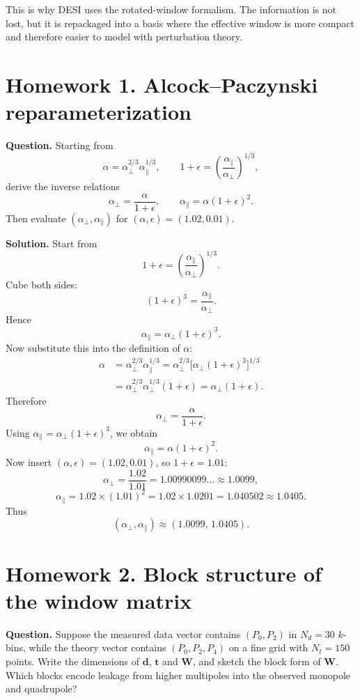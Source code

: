 \documentclass[11pt]{article}
\newcommand{\W}{\mathbf W}
\newcommand{\tvec}{\mathbf t}
\newcommand{\dvec}{\mathbf d}
\begin{document}
This is why DESI uses the rotated-window formalism. The information is not lost, but it is repackaged into a basis where the effective window is more compact and therefore easier to model with perturbation theory.

\section*{Homework 1. Alcock--Paczynski reparameterization}
\textbf{Question.} Starting from
\[
\alpha=\alpha_{\perp}^{2/3}\alpha_{\parallel}^{1/3},
\qquad
1+\epsilon=\left(\frac{\alpha_{\parallel}}{\alpha_{\perp}}\right)^{1/3},
\]
derive the inverse relations
\[
\alpha_{\perp}=\frac{\alpha}{1+\epsilon},
\qquad
\alpha_{\parallel}=\alpha(1+\epsilon)^2.
\]
Then evaluate $(\alpha_{\perp},\alpha_{\parallel})$ for $(\alpha,\epsilon)=(1.02,0.01)$.

\bigskip
\textbf{Solution.}
Start from
\[
1+\epsilon=\left(\frac{\alpha_{\parallel}}{\alpha_{\perp}}\right)^{1/3}.
\]
Cube both sides:
\[
(1+\epsilon)^3=\frac{\alpha_{\parallel}}{\alpha_{\perp}}.
\]
Hence
\[
\alpha_{\parallel}=\alpha_{\perp}(1+\epsilon)^3.
\]
Now substitute this into the definition of $\alpha$:
\begin{align*}
\alpha
&=\alpha_{\perp}^{2/3}\alpha_{\parallel}^{1/3}
=\alpha_{\perp}^{2/3}\big[\alpha_{\perp}(1+\epsilon)^3\big]^{1/3}\\
&=\alpha_{\perp}^{2/3}\alpha_{\perp}^{1/3}(1+\epsilon)
=\alpha_{\perp}(1+\epsilon).
\end{align*}
Therefore
\[
\boxed{\alpha_{\perp}=\frac{\alpha}{1+\epsilon}.}
\]
Using $\alpha_{\parallel}=\alpha_{\perp}(1+\epsilon)^3$, we obtain
\[
\boxed{\alpha_{\parallel}=\alpha(1+\epsilon)^2.}
\]
Now insert $(\alpha,\epsilon)=(1.02,0.01)$, so $1+\epsilon=1.01$:
\[
\alpha_{\perp}=\frac{1.02}{1.01}=1.00990099\ldots \approx 1.0099,
\]
\[
\alpha_{\parallel}=1.02\times(1.01)^2=1.02\times 1.0201=1.040502\approx 1.0405.
\]
Thus
\[
\boxed{(\alpha_{\perp},\alpha_{\parallel})\approx (1.0099,\,1.0405).}
\]

\section*{Homework 2. Block structure of the window matrix}
\textbf{Question.} Suppose the measured data vector contains $(P_0,P_2)$ in $N_d=30$ $k$-bins, while the theory vector contains $(P_0,P_2,P_4)$ on a fine grid with $N_t=150$ points. Write the dimensions of $\dvec$, $\tvec$ and $\W$, and sketch the block form of $\W$. Which blocks encode leakage from higher multipoles into the observed monopole and quadrupole?
\end{document}
